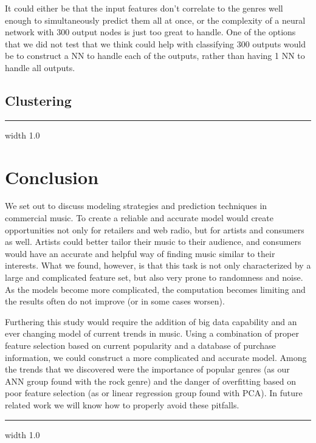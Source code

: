 \documentclass[12pt]{article}
\newcommand{\horizontalLine}{
	\begin{center}
		\hrule width 1.0\textwidth
	\end{center}
}
\begin{document}
It could either be that the input features don't correlate to the genres well enough to simultaneously predict them all at once, or the complexity of a neural network with 300 output nodes is just too great to handle. One of the options that we did not test that we think could help with classifying 300 outputs would be to construct a NN to handle each of the outputs, rather than having 1 NN to handle all outputs. 

\subsection{Clustering}
\label{subsec:clusteringDisc}

\horizontalLine
\section{Conclusion}
\label{sec:conclusion}

We set out to discuss modeling strategies and prediction techniques in commercial music. To create a reliable and accurate model would create opportunities not only for retailers and web radio, but for artists and consumers as well. Artists could better tailor their music to their audience, and consumers would have an accurate and helpful way of finding music similar to their interests. What we found, however, is that this task is not only characterized by a large and complicated feature set, but also very prone to randomness and noise. As the models become more complicated, the computation becomes limiting and the results often do not improve (or in some cases worsen).

Furthering this study would require the addition of big data capability and an ever changing model of current trends in music. Using a combination of proper feature selection based on current popularity and a database of purchase information, we could construct a more complicated and accurate model. Among the trends that we discovered were the importance of popular genres (as our ANN group found with the rock genre) and the danger of overfitting based on poor feature selection (as or linear regression group found with PCA). In future related work we will know how to properly avoid these pitfalls.

\horizontalLine
\end{document}
